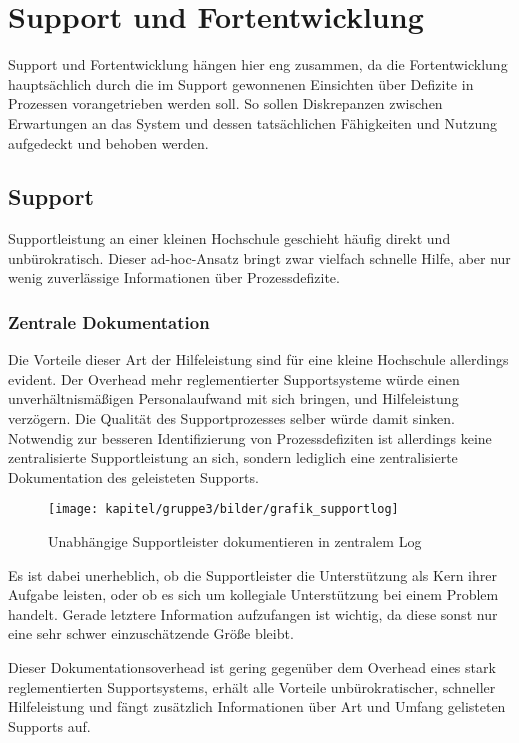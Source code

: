 \section{Support und Fortentwicklung}
Support und Fortentwicklung hängen hier eng zusammen, da die Fortentwicklung hauptsächlich durch die im Support gewonnenen Einsichten über Defizite in Prozessen vorangetrieben werden soll. So sollen Diskrepanzen zwischen Erwartungen an das System und dessen tatsächlichen Fähigkeiten und Nutzung aufgedeckt und behoben werden.

\subsection{Support}
Supportleistung an einer kleinen Hochschule geschieht häufig direkt und unbürokratisch. Dieser ad-hoc-Ansatz bringt zwar vielfach schnelle Hilfe, aber nur wenig zuverlässige Informationen über Prozessdefizite.

\subsubsection{Zentrale Dokumentation}
Die Vorteile dieser Art der Hilfeleistung sind für eine kleine Hochschule allerdings evident. Der Overhead mehr reglementierter Supportsysteme würde einen unverhältnismäßigen Personalaufwand mit sich bringen, und Hilfeleistung verzögern. Die Qualität des Supportprozesses selber würde damit sinken.
Notwendig zur besseren Identifizierung von Prozessdefiziten ist allerdings keine zentralisierte Supportleistung an sich, sondern lediglich eine zentralisierte Dokumentation des geleisteten Supports.

\begin{figure}[h!]
	\centering
	\texttt{[image: kapitel/gruppe3/bilder/grafik\_supportlog]}
	\caption{Unabhängige Supportleister dokumentieren in zentralem Log}
	\label{fig_zentraler_supportlog}
\end{figure}

Es ist dabei unerheblich, ob die Supportleister die Unterstützung als Kern ihrer Aufgabe leisten, oder ob es sich um kollegiale Unterstützung bei einem Problem handelt. Gerade letztere Information aufzufangen ist wichtig, da diese sonst nur eine sehr schwer einzuschätzende Größe bleibt.

Dieser Dokumentationsoverhead ist gering gegenüber dem Overhead eines stark reglementierten Supportsystems, erhält alle Vorteile unbürokratischer, schneller Hilfeleistung und fängt zusätzlich Informationen über Art und Umfang gelisteten Supports auf.

